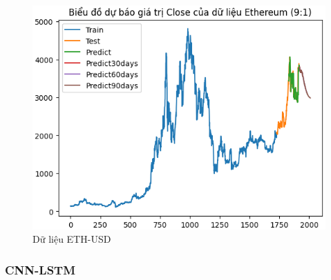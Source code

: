 \documentclass[conference]{IEEEtran}
\begin{document}
\begin{figure}[H]
\begin{minipage}{0.15\textwidth}
    \includegraphics[width=1\textwidth]{Figure/RNN_ETH91.png}
    \end{minipage}
    \caption{Dữ liệu ETH-USD}
    \label{fig:1}
\end{figure}

\subsubsection{CNN-LSTM}
\end{document}

